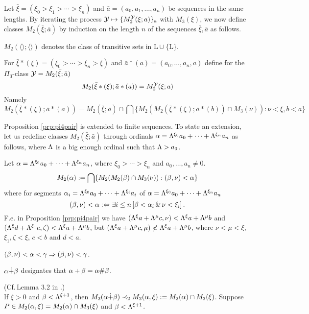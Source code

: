 \documentclass{article}
\begin{document}
Let $\bar{\xi}=(\xi_{0}>\xi_{1}>\cdots>\xi_{n})$ and
$\bar{a}=(a_{0},a_{1},\ldots,a_{n})$ be sequences in the same lengths.
By iterating the process ${\cal Y}\mapsto \{M_{2}^{{\cal Y}}(\xi;a)\}_{a}$
with $M_{3}(\xi)$, we now define 
classes $M_{2}(\bar{\xi};\bar{a})$ 
by induction on the length $n$ of the sequences $\bar{\xi}, \bar{a}$
as follows. 

$M_{2}(\langle\rangle;\langle\rangle)$ denotes the class of transitive sets in $\mbox{L}\cup\{\mbox{L}\}$.

  
For  $\bar{\xi}*(\xi)=(\xi_{0}>\cdots>\xi_{n}>\xi)$ and $\bar{a}*(a)=(a_{0},\ldots,a_{n},a)$ define 
for  the $\Pi_{3}$-class
 ${\cal Y}=M_{2}(\bar{\xi};\bar{a})$
\[
M_{2}(\bar{\xi}*(\xi);\bar{a}*(a)) =M_{2}^{{\cal Y}}(\xi;a)
\]
Namely
\[
M_{2}(\bar{\xi}*(\xi);\bar{a}*(a)) = M_{2}(\bar{\xi};\bar{a})\cap 
\bigcap\{M_{2}\left(M_{2}(\bar{\xi}*(\xi);\bar{a}*(b))\cap M_{3}(\nu)\right):  \nu<\xi, b<a\}  
\]

Proposition \ref{prp:pi4pair} is extended to finite sequences.
To state an extension, let us redefine classes $M_{2}(\bar{\xi};\bar{a})$
through ordinals
$\alpha=\Lambda^{\xi_{0}}a_{0}+\cdots+\Lambda^{\xi_{n}}a_{n}$ as follows, where
$\Lambda$ is a big enough ordinal such that $\Lambda>a_{0}$.

Let $\alpha=\Lambda^{\xi_{0}}a_{0}+\cdots+\Lambda^{\xi_{n}}a_{n}$, where $\xi_{0}>\cdots>\xi_{n}$ and
$a_{0},\ldots,a_{n}\neq 0$.
\[
M_{2}(\alpha):=\bigcap\{
M_{2}(M_{2}(\beta)\cap M_{3}(\nu)):(\beta,\nu)<\alpha\}
\]
where
 for segments $\alpha_{i}=\Lambda^{\xi_{0}}a_{0}+\cdots+\Lambda^{\xi_{i}}a_{i}$ of 
$\alpha=\Lambda^{\xi_{0}}a_{0}+\cdots+\Lambda^{\xi_{n}}a_{n}$
\[
(\beta,\nu)< \alpha :\Leftrightarrow \exists i\leq n\left[
\beta<\alpha_{i} \,\&\, \nu<\xi_{i}
\right]
.\]
F.e. in Proposition \ref{prp:pi4pair} we have
$(\Lambda^{\xi}a+\Lambda^{\mu}c,\nu)<\Lambda^{\xi}a+\Lambda^{\mu}b$ and $(\Lambda^{\xi}d+\Lambda^{\xi_{1}}e, \zeta)<\Lambda^{\xi}a+\Lambda^{\mu}b$, but
$(\Lambda^{\xi}a+\Lambda^{\mu}c,\mu)\not<\Lambda^{\xi}a+\Lambda^{\mu}b$,
where
$\nu<\mu<\xi$, $\xi_{1},\zeta<\xi$, $c<b$ and $d<a$.


\bprp\label{prp:less1}
$(\beta,\nu)<\alpha<\gamma \Rightarrow (\beta,\nu)<\gamma$.
\eprp

$\alpha\dot{+}\beta$ designates that $\alpha+\beta=\alpha\#\beta$.

\blem\label{lem:stepdownint}{\rm (Cf.\,Lemma 3.2 in \cite{LMPS}.)}\\
If $\xi>0$ and $\beta<\Lambda^{\xi+1}$, then
$M_{2}(\alpha\dot{+}\beta)\prec_{2} M_{2}(\alpha,\xi):=M_{2}(\alpha)\cap M_{3}(\xi)$.
\elem
\bprf
Suppose $P\in M_{2}(\alpha,\xi)=M_{2}(\alpha)\cap M_{3}(\xi)$ and $\beta<\Lambda^{\xi+1}$.
\end{document}
